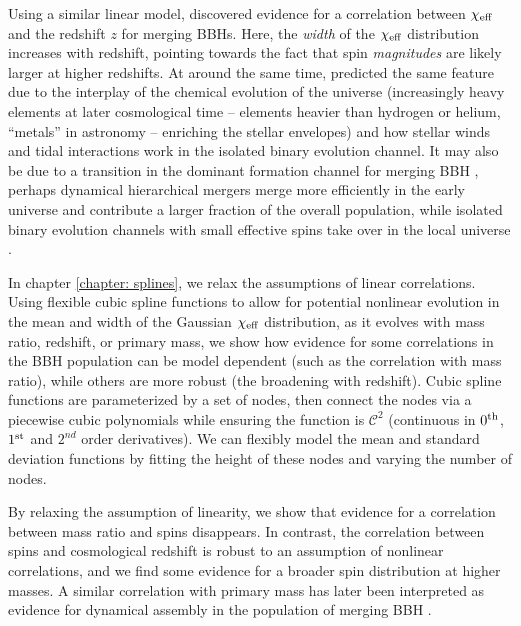 \begin{refsection}
Using a similar linear model, \citet{Biscoveanu:2022qac} discovered evidence for a correlation between $\chi_{\rm eff}$ and the redshift $z$ for merging \acp{BBH}. Here, the \textit{width} of the $\chi_{\rm eff}$ distribution increases with redshift, pointing towards the fact that spin \textit{magnitudes} are likely larger at higher redshifts. At around the same time, \citet{Bavera:2022mef} predicted the same feature due to the interplay of the chemical evolution of the universe (increasingly heavy elements at later cosmological time -- elements heavier than hydrogen or helium, ``metals'' in astronomy -- enriching the stellar envelopes) and how stellar winds and tidal interactions work in the isolated binary evolution channel. It may also be due to a transition in the dominant formation channel for merging \ac{BBH} \citep{Bavera:2022mef}, perhaps dynamical hierarchical mergers merge more efficiently in the early universe and contribute a larger fraction of the overall population, while isolated binary evolution channels with small effective spins take over in the local universe \citep[e.g.][]{Belczynski:2017gds, Gerosa:2021mno}.  


In chapter \ref{chapter: splines}, we relax the assumptions of linear correlations. Using flexible cubic spline functions to allow for potential nonlinear evolution in the mean and width of the Gaussian $\chi_{\rm eff}$ distribution, as it evolves with mass ratio, redshift, or primary mass, we show how evidence for some correlations in the \ac{BBH} population can be model dependent (such as the correlation with mass ratio), while others are more robust (the broadening with redshift). Cubic spline functions are parameterized by a set of nodes, then connect the nodes via a piecewise cubic polynomials while ensuring the function is $\mathcal{C}^2$ (continuous in $0^{\rm th}$, $1^{\rm st}$ and $2^{nd}$ order derivatives). We can flexibly model the mean and standard deviation functions by fitting the height of these nodes and varying the number of nodes. 

By relaxing the assumption of linearity, we show that evidence for a correlation between mass ratio and spins disappears. In contrast, the correlation between spins and cosmological redshift is robust to an assumption of nonlinear correlations, and we find some evidence for a broader spin distribution at higher masses. A similar correlation with primary mass has later been interpreted as evidence for dynamical assembly in the population of merging \ac{BBH} \citep[e.g.][]{Antonini:2024het, Plunkett:2026pxt}.  


\end{refsection}
